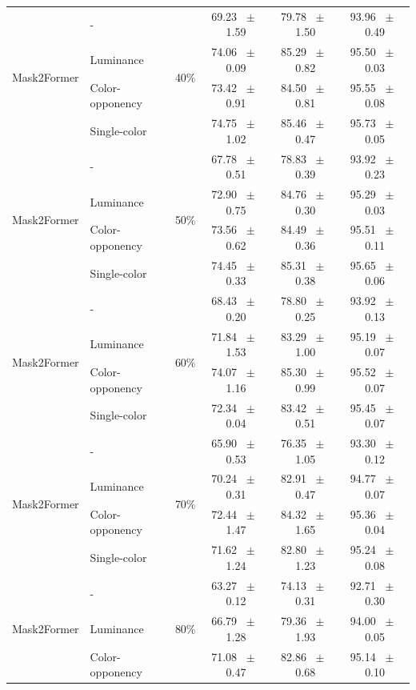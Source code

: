\begin{table}[h]
\begin{tabular}{@{}l l c c c c@{}}
    \multirow{4}{*}{Mask2Former} & - & \multirow{4}{*}{40\%} & 69.23 ~$\pm$~ 1.59 & 79.78 ~$\pm$~ 1.50 & 93.96 ~$\pm$~ 0.49 \\
    & Luminance &  & 74.06 ~$\pm$~ 0.09 & 85.29 ~$\pm$~ 0.82 & 95.50 ~$\pm$~ 0.03 \\
    & Color-opponency &  & 73.42 ~$\pm$~ 0.91 & 84.50 ~$\pm$~ 0.81 & 95.55 ~$\pm$~ 0.08 \\
    & Single-color &  & 74.75 ~$\pm$~ 1.02 & 85.46 ~$\pm$~ 0.47 & 95.73 ~$\pm$~ 0.05 \\
    \midrule
    \multirow{4}{*}{Mask2Former} & - & \multirow{4}{*}{50\%} & 67.78 ~$\pm$~ 0.51 & 78.83 ~$\pm$~ 0.39 & 93.92 ~$\pm$~ 0.23 \\
    & Luminance &  & 72.90 ~$\pm$~ 0.75 & 84.76 ~$\pm$~ 0.30 & 95.29 ~$\pm$~ 0.03 \\
    & Color-opponency &  & 73.56 ~$\pm$~ 0.62 & 84.49 ~$\pm$~ 0.36 & 95.51 ~$\pm$~ 0.11 \\
    & Single-color &  & 74.45 ~$\pm$~ 0.33 & 85.31 ~$\pm$~ 0.38 & 95.65 ~$\pm$~ 0.06 \\
    \midrule
    \multirow{4}{*}{Mask2Former} & - & \multirow{4}{*}{60\%} & 68.43 ~$\pm$~ 0.20 & 78.80 ~$\pm$~ 0.25 & 93.92 ~$\pm$~ 0.13 \\
    & Luminance &  & 71.84 ~$\pm$~ 1.53 & 83.29 ~$\pm$~ 1.00 & 95.19 ~$\pm$~ 0.07 \\
    & Color-opponency &  & 74.07 ~$\pm$~ 1.16 & 85.30 ~$\pm$~ 0.99 & 95.52 ~$\pm$~ 0.07 \\
    & Single-color &  & 72.34 ~$\pm$~ 0.04 & 83.42 ~$\pm$~ 0.51 & 95.45 ~$\pm$~ 0.07 \\
    \midrule
    \multirow{4}{*}{Mask2Former} & - & \multirow{4}{*}{70\%} & 65.90 ~$\pm$~ 0.53 & 76.35 ~$\pm$~ 1.05 & 93.30 ~$\pm$~ 0.12 \\
    & Luminance &  & 70.24 ~$\pm$~ 0.31 & 82.91 ~$\pm$~ 0.47 & 94.77 ~$\pm$~ 0.07 \\
    & Color-opponency &  & 72.44 ~$\pm$~ 1.47 & 84.32 ~$\pm$~ 1.65 & 95.36 ~$\pm$~ 0.04 \\
    & Single-color &  & 71.62 ~$\pm$~ 1.24 & 82.80 ~$\pm$~ 1.23 & 95.24 ~$\pm$~ 0.08 \\
    \midrule
    \multirow{4}{*}{Mask2Former} & - & \multirow{4}{*}{80\%} & 63.27 ~$\pm$~ 0.12 & 74.13 ~$\pm$~ 0.31 & 92.71 ~$\pm$~ 0.30 \\
    & Luminance &  & 66.79 ~$\pm$~ 1.28 & 79.36 ~$\pm$~ 1.93 & 94.00 ~$\pm$~ 0.05 \\
    & Color-opponency &  & 71.08 ~$\pm$~ 0.47 & 82.86 ~$\pm$~ 0.68 & 95.14 ~$\pm$~ 0.10 \\

\end{tabular}
\end{table}
